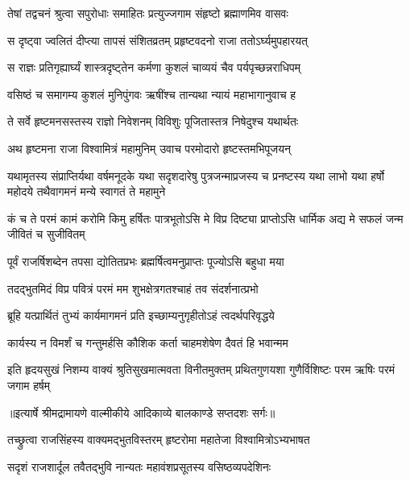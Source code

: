 \twolineshloka
{तेषां तद्वचनं श्रुत्वा सपुरोधाः समाहितः}
{प्रत्युज्जगाम संहृष्टो ब्रह्माणमिव वासवः} %

\twolineshloka
{स दृष्ट्वा ज्वलितं दीप्त्या तापसं संशितव्रतम्}
{प्रहृष्टवदनो राजा ततोऽर्घ्यमुपहारयत्} %

\twolineshloka
{स राज्ञः प्रतिगृह्यार्घ्यं शास्त्रदृष्ट्तेन कर्मणा}
{कुशलं चाव्ययं चैव पर्यपृच्छन्नराधिपम्} %

\twolineshloka
{वसिष्ठं च समागम्य कुशलं मुनिपुंगवः}
{ऋषींश्च तान्यथा न्यायं महाभागानुवाच ह} %

\twolineshloka
{ते सर्वे हृष्टमनसस्तस्य राज्ञो निवेशनम्}
{विविशुः पूजितास्तत्र निषेदुश्च यथार्थतः} %

\twolineshloka
{अथ हृष्टमना राजा विश्वामित्रं महामुनिम्}
{उवाच परमोदारो हृष्टस्तमभिपूजयन्} %

\fourlineshloka
{यथामृतस्य संप्राप्तिर्यथा वर्षमनूदके}
{यथा सदृशदारेषु पुत्रजन्माप्रजस्य च}
{प्रनष्टस्य यथा लाभो यथा हर्षो महोदये}
{तथैवागमनं मन्ये स्वागतं ते महामुने} %

\threelineshloka
{कं च ते परमं कामं करोमि किमु हर्षितः}
{पात्रभूतोऽसि मे विप्र दिष्ट्या प्राप्तोऽसि धार्मिक}
{अद्य मे सफलं जन्म जीवितं च सुजीवितम्} %

\twolineshloka
{पूर्वं राजर्षिशब्देन तपसा द्योतितप्रभः}
{ब्रह्मर्षित्वमनुप्राप्तः पूज्योऽसि बहुधा मया} %

\twolineshloka
{तदद्भुतमिदं विप्र पवित्रं परमं मम}
{शुभक्षेत्रगतश्चाहं तव संदर्शनात्प्रभो} %

\twolineshloka
{ब्रूहि यत्प्रार्थितं तुभ्यं कार्यमागमनं प्रति}
{इच्छाम्यनुगृहीतोऽहं त्वदर्थपरिवृद्धये} %

\twolineshloka
{कार्यस्य न विमर्शं च गन्तुमर्हसि कौशिक}
{कर्ता चाहमशेषेण दैवतं हि भवान्मम} %

\fourlineindentedshloka
{इति हृदयसुखं निशम्य वाक्यं}
{ श्रुतिसुखमात्मवता विनीतमुक्तम्}
{प्रथितगुणयशा गुणैर्विशिष्टः}
{ परम ऋषिः परमं जगाम हर्षम्} %


{॥इत्यार्षे श्रीमद्रामायणे वाल्मीकीये आदिकाव्ये बालकाण्डे सप्तदशः सर्गः॥}


\twolineshloka
{तच्छ्रुत्वा राजसिंहस्य वाक्यमद्भुतविस्तरम्}
{हृष्टरोमा महातेजा विश्वामित्रोऽभ्यभाषत} %

\twolineshloka
{सदृशं राजशार्दूल तवैतद्भुवि नान्यतः}
{महावंशप्रसूतस्य वसिष्ठव्यपदेशिनः} %

